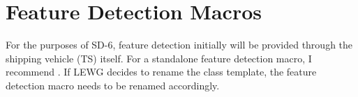 \section{Feature Detection Macros}\label{sec:feature-detection}

For the purposes of SD-6, feature detection initially will be provided through the shipping vehicle (TS) itself.
For a standalone feature detection macro, I recommend .
If LEWG decides to rename the \datapar class template, the feature detection macro needs to be renamed accordingly.

